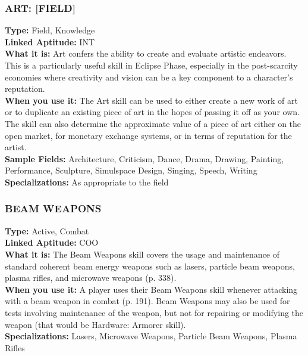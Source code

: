 \subsubsection{ART: [FIELD]}
\textbf{Type:} Field, Knowledge
\\ \textbf{Linked Aptitude:} INT
\\ \textbf{What it is:} Art confers the ability to create and evaluate artistic endeavors. This is a particularly useful
skill in Eclipse Phase, especially in the post-scarcity
economies where creativity and vision can be a key
component to a character’s reputation.
\\ \textbf{When you use it:} The Art skill can be used to either
create a new work of art or to duplicate an existing
piece of art in the hopes of passing it off as your own.
The skill can also determine the approximate value of
a piece of art either on the open market, for monetary
exchange systems, or in terms of reputation for the
artist.
\\ \textbf{Sample Fields:} Architecture, Criticism, Dance, Drama,
Drawing, Painting, Performance, Sculpture, Simulspace Design, Singing, Speech, Writing
\\ \textbf{Specializations:} As appropriate to the field

\subsubsection{BEAM WEAPONS}
\textbf{Type:} Active, Combat
\\ \textbf{Linked Aptitude:} COO
\\ \textbf{What it is:} The Beam Weapons skill covers the usage
and maintenance of standard coherent beam energy
weapons such as lasers, particle beam weapons,
plasma rifles, and microwave weapons (p. 338).
\\ \textbf{When you use it:} A player uses their Beam Weapons skill whenever attacking with a beam weapon in
combat (p. 191). Beam Weapons may also be used for
tests involving maintenance of the weapon, but not
for repairing or modifying the weapon (that would be
Hardware: Armorer skill).
\\ \textbf{Specializations:} Lasers, Microwave Weapons, Particle
Beam Weapons, Plasma Rifles

